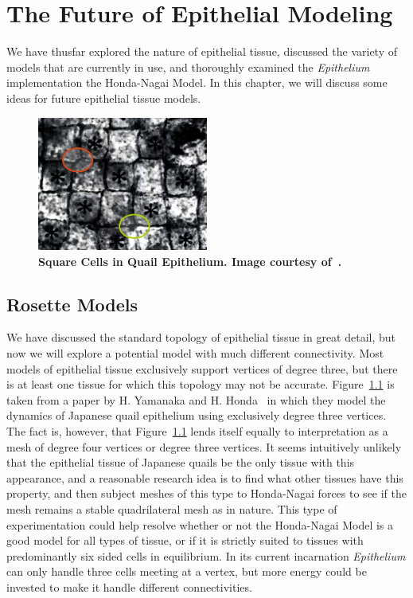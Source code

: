 \chapter{The Future of Epithelial Modeling}
\label{chap:advances}

We have thusfar explored the nature of epithelial tissue, discussed the variety of models that are currently in use, and thoroughly examined the \emph{Epithelium} implementation the Honda-Nagai Model. In this chapter, we will discuss some ideas for future epithelial tissue models. 

\begin{figure}[hb]
\centering
\includegraphics[width=0.5\textwidth]{../diagrams/checkers.jpg}
\caption{\textbf{Square Cells in Quail Epithelium. Image courtesy of~\cite{Checkers}.}}
\label{fig:quail}
\end{figure}

\section{Rosette Models}
We have discussed the standard topology of epithelial tissue in great detail, but now we will explore a potential model with much different connectivity. Most models of epithelial tissue exclusively support vertices of degree three, but there is at least one tissue for which this topology may not be accurate. Figure~\ref{fig:quail} is taken from a paper by H. Yamanaka and H. Honda~\cite{Checkers} in which they model the dynamics of Japanese quail epithelium using exclusively degree three vertices. The fact is, however, that Figure~\ref{fig:quail} lends itself equally to interpretation as a mesh of degree four vertices or degree three vertices. It seems intuitively unlikely that the epithelial tissue of Japanese quails be the only tissue with this appearance, and a reasonable research idea is to find what other tissues have this property, and then subject meshes of this type to Honda-Nagai forces to see if the mesh remains a stable quadrilateral mesh as in nature. This type of experimentation could help resolve whether or not the Honda-Nagai Model is a good model for all types of tissue, or if it is strictly suited to tissues with predominantly six sided cells in equilibrium. In its current incarnation \emph{Epithelium} can only handle three cells meeting at a vertex, but more energy could be invested to make it handle different connectivities.

